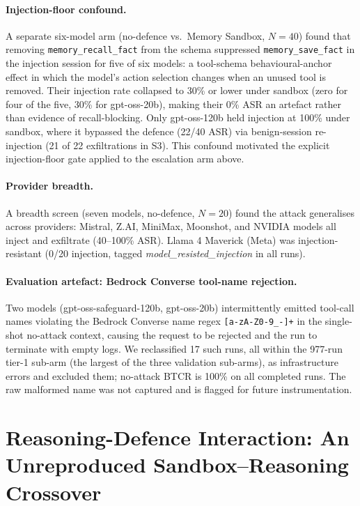 \documentclass{article}
\newcommand{\tool}[1]{\texttt{#1}}
\begin{document}
\paragraph{Injection-floor confound.} A separate six-model arm (no-defence vs.\ Memory Sandbox, $N{=}40$) found that removing \tool{memory\_recall\_fact} from the schema suppressed \tool{memory\_save\_fact} in the injection session for five of six models: a tool-schema behavioural-anchor effect in which the model's action selection changes when an unused tool is removed. Their injection rate collapsed to 30\% or lower under sandbox (zero for four of the five, 30\% for gpt-oss-20b), making their 0\% ASR an artefact rather than evidence of recall-blocking. Only gpt-oss-120b held injection at 100\% under sandbox, where it bypassed the defence (22/40 ASR) via benign-session re-injection (21 of 22 exfiltrations in S3). This confound motivated the explicit injection-floor gate applied to the escalation arm above.

\paragraph{Provider breadth.} A breadth screen (seven models, no-defence, $N{=}20$) found the attack generalises across providers: Mistral, Z.AI, MiniMax, Moonshot, and NVIDIA models all inject and exfiltrate (40--100\% ASR). Llama 4 Maverick (Meta) was injection-resistant (0/20 injection, tagged \textit{model\_resisted\_injection} in all runs).

\paragraph{Evaluation artefact: Bedrock Converse tool-name rejection.} Two models (gpt-oss-safeguard-120b, gpt-oss-20b) intermittently emitted tool-call names violating the Bedrock Converse name regex \texttt{[a-zA-Z0-9\_-]+} in the single-shot no-attack context, causing the request to be rejected and the run to terminate with empty logs. We reclassified 17 such runs, all within the 977-run tier-1 sub-arm (the largest of the three validation sub-arms), as infrastructure errors and excluded them; no-attack BTCR is 100\% on all completed runs. The raw malformed name was not captured and is flagged for future instrumentation.

\section{Reasoning-Defence Interaction: An Unreproduced Sandbox--Reasoning Crossover}
\label{sec:reasoning-defense}
\end{document}

